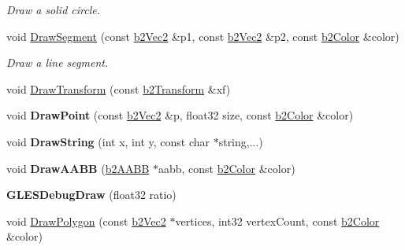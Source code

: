 \begin{DoxyCompactItemize}
\begin{DoxyCompactList}\small\item\em Draw a solid circle. \end{DoxyCompactList}\item 
\hypertarget{class_g_l_e_s_debug_draw_a2a24d1fe4eb99b6382380c234ab77382}{void \hyperlink{class_g_l_e_s_debug_draw_a2a24d1fe4eb99b6382380c234ab77382}{Draw\-Segment} (const \hyperlink{structb2_vec2}{b2\-Vec2} \&p1, const \hyperlink{structb2_vec2}{b2\-Vec2} \&p2, const \hyperlink{structb2_color}{b2\-Color} \&color)}\label{class_g_l_e_s_debug_draw_a2a24d1fe4eb99b6382380c234ab77382}

\begin{DoxyCompactList}\small\item\em Draw a line segment. \end{DoxyCompactList}\item 
void \hyperlink{class_g_l_e_s_debug_draw_a2306fb12b6f6e69d84fcb79bcddfcfbf}{Draw\-Transform} (const \hyperlink{structb2_transform}{b2\-Transform} \&xf)
\item 
\hypertarget{class_g_l_e_s_debug_draw_a84ce73b36e8b9e2843b2deacebeee839}{void {\bfseries Draw\-Point} (const \hyperlink{structb2_vec2}{b2\-Vec2} \&p, float32 size, const \hyperlink{structb2_color}{b2\-Color} \&color)}\label{class_g_l_e_s_debug_draw_a84ce73b36e8b9e2843b2deacebeee839}

\item 
\hypertarget{class_g_l_e_s_debug_draw_a16aaca99009b9423fe288b5815c8dbcf}{void {\bfseries Draw\-String} (int x, int y, const char $\ast$string,...)}\label{class_g_l_e_s_debug_draw_a16aaca99009b9423fe288b5815c8dbcf}

\item 
\hypertarget{class_g_l_e_s_debug_draw_a6dc5d6adbc8279c9d378311b66ddcf53}{void {\bfseries Draw\-A\-A\-B\-B} (\hyperlink{structb2_a_a_b_b}{b2\-A\-A\-B\-B} $\ast$aabb, const \hyperlink{structb2_color}{b2\-Color} \&color)}\label{class_g_l_e_s_debug_draw_a6dc5d6adbc8279c9d378311b66ddcf53}

\item 
\hypertarget{class_g_l_e_s_debug_draw_a658e964ffb386b8b67fb5a3bc5db27a3}{{\bfseries G\-L\-E\-S\-Debug\-Draw} (float32 ratio)}\label{class_g_l_e_s_debug_draw_a658e964ffb386b8b67fb5a3bc5db27a3}

\item 
\hypertarget{class_g_l_e_s_debug_draw_afab4f8ea8882119f62134f9667e9e2da}{void \hyperlink{class_g_l_e_s_debug_draw_afab4f8ea8882119f62134f9667e9e2da}{Draw\-Polygon} (const \hyperlink{structb2_vec2}{b2\-Vec2} $\ast$vertices, int32 vertex\-Count, const \hyperlink{structb2_color}{b2\-Color} \&color)}\label{class_g_l_e_s_debug_draw_afab4f8ea8882119f62134f9667e9e2da}


\end{DoxyCompactItemize}
